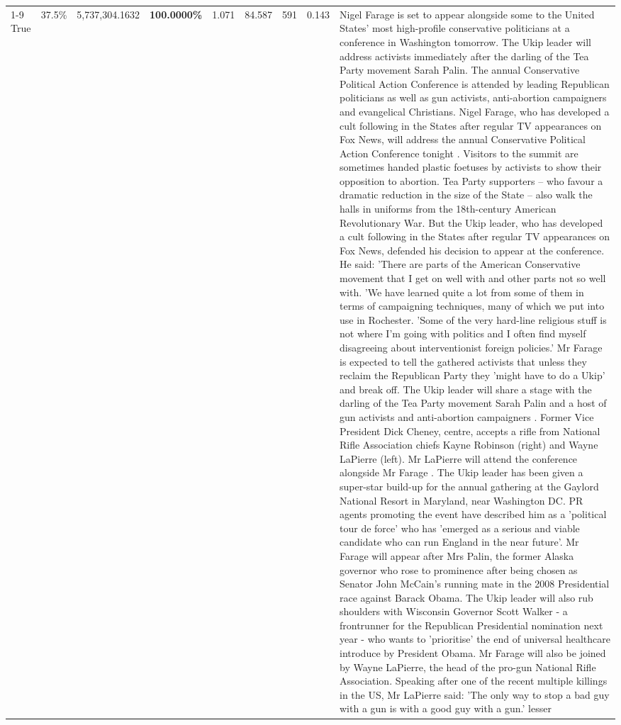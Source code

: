 \begin{table}[H]
\begin{tabular}{lllrlllll}
\cline{1-9} \cline{2-9}
True & 37.5\% & 5,737,304.1632 & \bfseries \color{red} 100.0000\% & 1.071 & 84.587 & 591 & 0.143 & Nigel Farage is set to appear alongside some to the United States' most high-profile conservative politicians at a conference in Washington tomorrow. The Ukip leader will address activists immediately after the darling of the Tea Party movement Sarah Palin. The annual Conservative Political Action Conference is attended by leading Republican politicians as well as gun activists, anti-abortion campaigners and evangelical Christians. Nigel Farage, who has developed a cult following in the States after regular TV appearances on Fox News, will address the annual Conservative Political Action Conference tonight . Visitors to the summit are sometimes handed plastic foetuses by activists to show their opposition to abortion. Tea Party supporters – who favour a dramatic reduction in the size of the State – also walk the halls in uniforms from the 18th-century American Revolutionary War. But the Ukip leader, who has developed a cult following in the States after regular TV appearances on Fox News, defended his decision to appear at the conference. He said: 'There are parts of the American Conservative movement that I get on well with and other parts not so well with. 'We have learned quite a lot from some of them in terms of campaigning techniques, many of which we put into use in Rochester. 'Some of the very hard-line religious stuff is not where I'm going with politics and I often find myself disagreeing about interventionist foreign policies.' Mr Farage is expected to tell the gathered activists that unless they reclaim the Republican Party they 'might have to do a Ukip' and break off. The Ukip leader will share a stage with the darling of the Tea Party movement Sarah Palin and a host of gun activists and anti-abortion campaigners . Former Vice President Dick Cheney, centre, accepts a rifle from National Rifle Association chiefs Kayne Robinson (right) and Wayne LaPierre (left). Mr LaPierre will attend the conference alongside Mr Farage . The Ukip leader has been given a super-star build-up for the annual gathering at the Gaylord National Resort in Maryland, near Washington DC. PR agents promoting the event have described him as a 'political tour de force' who has 'emerged as a serious and viable candidate who can run England in the near future'. Mr Farage will appear after Mrs Palin, the former Alaska governor who rose to prominence after being chosen as Senator John McCain's running mate in the 2008 Presidential race against Barack Obama. The Ukip leader will also rub shoulders with Wisconsin Governor Scott Walker - a frontrunner for the Republican Presidential nomination next year - who wants to 'prioritise' the end of universal healthcare introduce by President Obama. Mr Farage will also be joined by Wayne LaPierre, the head of the pro-gun National Rifle Association. Speaking after one of the recent multiple killings in the US, Mr LaPierre said: 'The only way to stop a bad guy with a gun is with a good guy with a gun.' lesser \\

\end{tabular}
\end{table}

